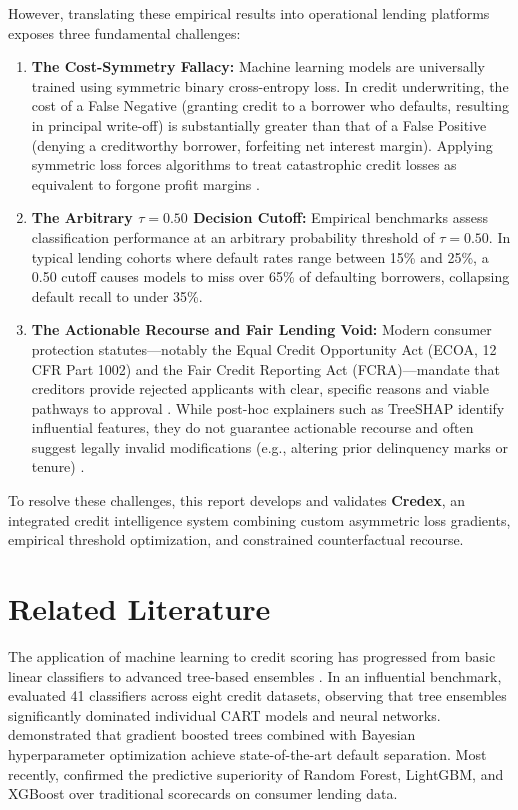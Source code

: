 \documentclass[11pt,a4paper]{article}
\begin{document}
However, translating these empirical results into operational lending platforms exposes three fundamental challenges:
\begin{enumerate}
    \item \textbf{The Cost-Symmetry Fallacy:} Machine learning models are universally trained using symmetric binary cross-entropy loss. In credit underwriting, the cost of a False Negative (granting credit to a borrower who defaults, resulting in principal write-off) is substantially greater than that of a False Positive (denying a creditworthy borrower, forfeiting net interest margin). Applying symmetric loss forces algorithms to treat catastrophic credit losses as equivalent to forgone profit margins \citep{elkan2001foundations, bahnsen2014novel}.
    \item \textbf{The Arbitrary $\tau = 0.50$ Decision Cutoff:} Empirical benchmarks assess classification performance at an arbitrary probability threshold of $\tau = 0.50$. In typical lending cohorts where default rates range between 15\% and 25\%, a 0.50 cutoff causes models to miss over 65\% of defaulting borrowers, collapsing default recall to under 35\%.
    \item \textbf{The Actionable Recourse and Fair Lending Void:} Modern consumer protection statutes---notably the Equal Credit Opportunity Act (ECOA, 12 CFR Part 1002) and the Fair Credit Reporting Act (FCRA)---mandate that creditors provide rejected applicants with clear, specific reasons and viable pathways to approval \citep{cfpb2022circular}. While post-hoc explainers such as TreeSHAP \citep{lundberg2017unified} identify influential features, they do not guarantee actionable recourse and often suggest legally invalid modifications (e.g., altering prior delinquency marks or tenure) \citep{ustun2019actionable, karimi2021model}.
\end{enumerate}

To resolve these challenges, this report develops and validates \textbf{Credex}, an integrated credit intelligence system combining custom asymmetric loss gradients, empirical threshold optimization, and constrained counterfactual recourse.

\section{Related Literature}
The application of machine learning to credit scoring has progressed from basic linear classifiers to advanced tree-based ensembles \citep{hand1997statistical, thomas2000survey, baesens2003benchmarking, lessmann2015benchmarking}. In an influential benchmark, \citet{lessmann2015benchmarking} evaluated 41 classifiers across eight credit datasets, observing that tree ensembles significantly dominated individual CART models and neural networks. \citet{xia2020credit} demonstrated that gradient boosted trees combined with Bayesian hyperparameter optimization achieve state-of-the-art default separation. Most recently, \citet{li2024evaluating} confirmed the predictive superiority of Random Forest, LightGBM, and XGBoost over traditional scorecards on consumer lending data.
\end{document}
